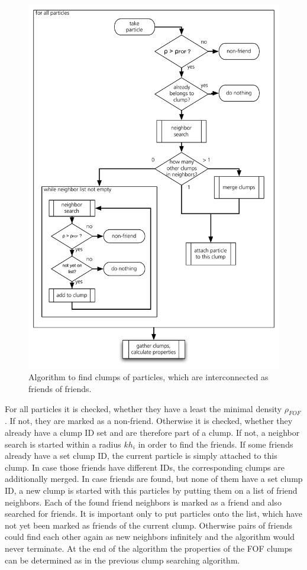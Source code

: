 \begin{figure}[htbp]
\begin{center}
\includegraphics[scale=0.6]{25algo_fof2.pdf}
\caption{Algorithm to find clumps of particles, which are interconnected as friends of friends.}
\label{ch02_fig25}
\end{center}
\end{figure}

For all particles it is checked, whether they have a least the minimal density $\rho_{FOF}$. If not, they are marked as a non-friend. Otherwise it is checked, whether they already have a clump ID set and are therefore part of a clump. If not, a neighbor search is started within a radius $k h_i$ in order to find the friends. If some friends already have a set clump ID, the current particle is simply attached to this clump. In case those friends have different IDs, the corresponding clumps are additionally merged. In case friends are found, but none of them have a set clump ID, a new clump is started with this particles by putting them on a list of friend neighbors. Each of the found friend neighbors is marked as a friend and also searched for friends. It is important only to put particles onto the list, which have not yet been marked as friends of the current clump. Otherwise pairs of friends could find each other again as new neighbors infinitely and the algorithm would never terminate. At the end of the algorithm the properties of the FOF clumps can be determined as in the previous clump searching algorithm. 

